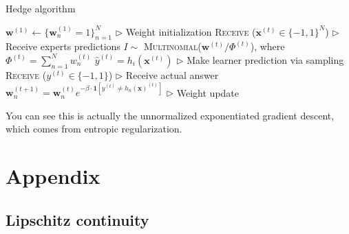 \documentclass[11pt]{article}
\newcommand{\bw}{\boldsymbol{w}}
\begin{document}
\begin{algorithm}[H]
\caption{Hedge algorithm}
\label{algo:rwma}
\begin{algorithmic}[1]
\STATE $\textbf{w}^{(1)} \leftarrow \{\bw_n^{(1)}=1\}_{n=1}^N$ \hfill $\triangleright$ Weight initialization
\STATE \textsc{Receive} ($\textbf{x}^{(t)}\in\{-1, 1\}^N$) \hfill $\triangleright$ Receive experts predictions
\STATE $I\sim$ \textsc{Multinomial}($\textbf{w}^{(t)}/\Phi^{(t)}$), where $\Phi^{(t)}=\sum_{n=1}^Nw_n^{(t)}$
\STATE $\hat{y}^{(t)}=h_i(\textbf{x}^{(t)})$ \hfill $\triangleright$ Make learner prediction via sampling
\STATE \textsc{Receive} ($y^{(t)}\in\{-1, 1\}$) \hfill $\triangleright$ Receive actual answer
\STATE $\bw_n^{(t+1)} =  \bw_n^{(t)}e^{-\beta\cdot\textbf{1}[y^{(t)}\neq h_n(\textbf{x})^{(t)}]}$ \hfill $\triangleright$ Weight update
\ENDFOR
\end{algorithmic}
\end{algorithm}

You can see this is actually the unnormalized exponentiated gradient descent, which comes from entropic regularization.



{


}

\section{Appendix}


\subsection{Lipschitz continuity}
\label{sec:l_smooth}
\end{document}
